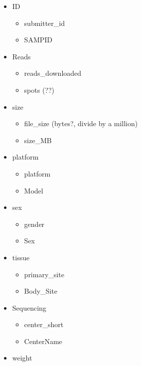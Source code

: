 \documentclass{article}
\providecommand{\tightlist}{%
      \setlength{\itemsep}{0pt}\setlength{\parskip}{0pt}}
\begin{document}
\begin{itemize}
\tightlist
\item
  ID

  \begin{itemize}
  \tightlist
  \item
    submitter\_id
  \item
    SAMPID
  \end{itemize}
\item
  Reads

  \begin{itemize}
  \tightlist
  \item
    reads\_downloaded
  \item
    spots (??)
  \end{itemize}
\item
  size

  \begin{itemize}
  \tightlist
  \item
    file\_size (bytes?, divide by a million)
  \item
    size\_MB
  \end{itemize}
\item
  platform

  \begin{itemize}
  \tightlist
  \item
    platform
  \item
    Model
  \end{itemize}
\item
  sex

  \begin{itemize}
  \tightlist
  \item
    gender
  \item
    Sex
  \end{itemize}
\item
  tissue

  \begin{itemize}
  \tightlist
  \item
    primary\_site
  \item
    Body\_Site
  \end{itemize}
\item
  Sequencing

  \begin{itemize}
  \tightlist
  \item
    center\_short
  \item
    CenterName
  \end{itemize}
\item
  weight


\end{itemize}
\end{document}
